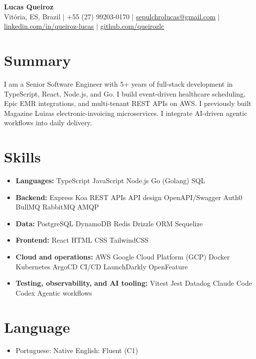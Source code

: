 \documentclass[letterpaper,10pt]{article}
\newcommand{\resumeItem}[1]{\item\small{#1}}
\newcommand{\resumeSubHeadingList}{\begin{itemize}[leftmargin=0.15in, label={}, nosep, beginpenalty=10000]}
\newcommand{\resumeSubHeadingListEnd}{\end{itemize}}
\begin{document}
\begin{center}
  \textbf{\Huge Lucas Queiroz} \\[3pt]
  \small Vit\'oria, ES, Brazil $|$ +55 (27) 99203-0170 $|$ \href{mailto:sepulchrolucas@gmail.com}{sepulchrolucas@gmail.com} $|$
  \href{https://linkedin.com/in/queiroz-lucas}{linkedin.com/in/queiroz-lucas} $|$
  \href{https://github.com/queirozlc}{github.com/queirozlc}
\end{center}
\vspace{2pt}

\section{Summary}
I am a Senior Software Engineer with 5+ years of full-stack development in TypeScript, React, Node.js, and Go. I build event-driven healthcare scheduling, Epic EMR integrations, and multi-tenant REST APIs on AWS. I previously built Magazine Luiza\textquotesingle{}s electronic-invoicing microservices. I integrate AI-driven agentic workflows into daily delivery.

\section{Skills}
\resumeSubHeadingList
\resumeItem{\textbf{Languages:} TypeScript \textbar{} JavaScript \textbar{} Node.js \textbar{} Go (Golang) \textbar{} SQL}
\resumeItem{\textbf{Backend:} Express \textbar{} Koa \textbar{} REST APIs \textbar{} API design \textbar{} OpenAPI/Swagger \textbar{} Auth0 \textbar{} BullMQ \textbar{} RabbitMQ \textbar{} AMQP}
\resumeItem{\textbf{Data:} PostgreSQL \textbar{} DynamoDB \textbar{} Redis \textbar{} Drizzle ORM \textbar{} Sequelize}
\resumeItem{\textbf{Frontend:} React \textbar{} HTML \textbar{} CSS \textbar{} TailwindCSS}
\resumeItem{\textbf{Cloud and operations:} AWS \textbar{} Google Cloud Platform (GCP) \textbar{} Docker \textbar{} Kubernetes \textbar{} ArgoCD \textbar{} CI/CD \textbar{} LaunchDarkly \textbar{} OpenFeature}
\resumeItem{\textbf{Testing, observability, and AI tooling:} Vitest \textbar{} Jest \textbar{} Datadog \textbar{} Claude Code \textbar{} Codex \textbar{} Agentic workflows}\resumeSubHeadingListEnd

\section{Language}
\resumeSubHeadingList
\resumeItem{Portuguese: Native \textbar{} English: Fluent (C1)}
\resumeSubHeadingListEnd
\end{document}
